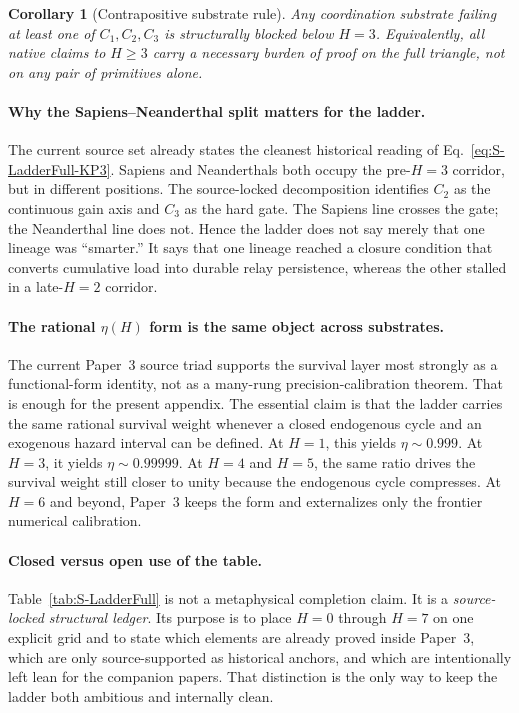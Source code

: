 \documentclass[11pt]{article}
\newtheorem{corollary}{Corollary}
\begin{document}
\begin{corollary}[Contrapositive substrate rule]
\label{cor:S-LadderFull-contrapositive}
Any coordination substrate failing at least one of
$C_1,C_2,C_3$
is structurally blocked below
$H{=}3$.
Equivalently,
all native claims to
$H\ge 3$
carry a necessary burden of proof on the full triangle,
not on any pair of primitives alone.
\end{corollary}

\paragraph{Why the Sapiens--Neanderthal split matters for the ladder.}
The current source set already states the cleanest historical reading of
Eq.~\eqref{eq:S-LadderFull-KP3}.
Sapiens and Neanderthals both occupy the pre-$H{=}3$ corridor,
but in different positions.
The source-locked decomposition identifies
$C_2$
as the continuous gain axis and
$C_3$
as the hard gate.
The Sapiens line crosses the gate;
the Neanderthal line does not.
Hence the ladder does not say merely that one lineage was ``smarter.''
It says that one lineage reached a closure condition that converts cumulative
load into durable relay persistence,
whereas the other stalled in a late-$H{=}2$ corridor.

\paragraph{The rational $\eta(H)$ form is the same object across substrates.}
The current Paper~3 source triad supports the survival layer most strongly as a
functional-form identity,
not as a many-rung precision-calibration theorem.
That is enough for the present appendix.
The essential claim is that the ladder carries the same rational survival
weight whenever a closed endogenous cycle and an exogenous hazard interval can
be defined.
At
$H{=}1$,
this yields
$\eta\sim 0.999$.
At
$H{=}3$,
it yields
$\eta\sim 0.99999$.
At
$H{=}4$ and
$H{=}5$,
the same ratio drives the survival weight still closer to unity because the
endogenous cycle compresses.
At
$H{=}6$ and beyond,
Paper~3 keeps the form and externalizes only the frontier numerical
calibration.

\paragraph{Closed versus open use of the table.}
Table~\ref{tab:S-LadderFull} is not a metaphysical completion claim.
It is a \emph{source-locked structural ledger}.
Its purpose is to place
$H{=}0$
through
$H{=}7$
on one explicit grid and to state which elements are already proved inside
Paper~3,
which are only source-supported as historical anchors,
and which are intentionally left lean for the companion papers.
That distinction is the only way to keep the ladder both ambitious and
internally clean.
\end{document}
